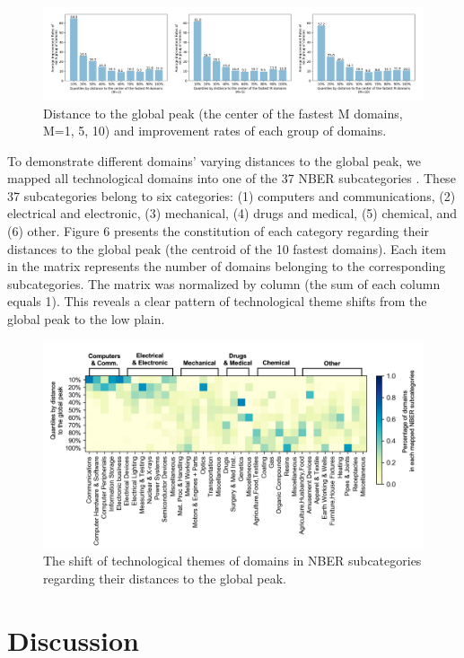 \documentclass{article}
\begin{document}
\begin{figure}[H]
	\centering
	\includegraphics[width=15cm]{FIG5.png}
	\caption{Distance to the global peak (the center of the fastest M domains, M=1, 5, 10) and improvement rates of each group of domains.}
	\label{fig:fig5}
\end{figure}

To demonstrate different domains’ varying distances to the global peak, we mapped all technological domains into one of the 37 NBER subcategories \cite{hall2001nber}. These 37 subcategories belong to six categories: (1) computers and communications, (2) electrical and electronic, (3) mechanical, (4) drugs and medical, (5) chemical, and (6) other. Figure 6 presents the constitution of each category regarding their distances to the global peak (the centroid of the 10 fastest domains). Each item in the matrix represents the number of domains belonging to the corresponding subcategories. The matrix was normalized by column (the sum of each column equals 1). This reveals a clear pattern of technological theme shifts from the global peak to the low plain.

\begin{figure}[H]
	\centering
	\includegraphics[width=15cm]{FIG6.png}
	\caption{The shift of technological themes of domains in NBER subcategories regarding their distances to the global peak.}
	\label{fig:fig6}
\end{figure}

\section{Discussion}
\label{sec:sec4}
\end{document}
